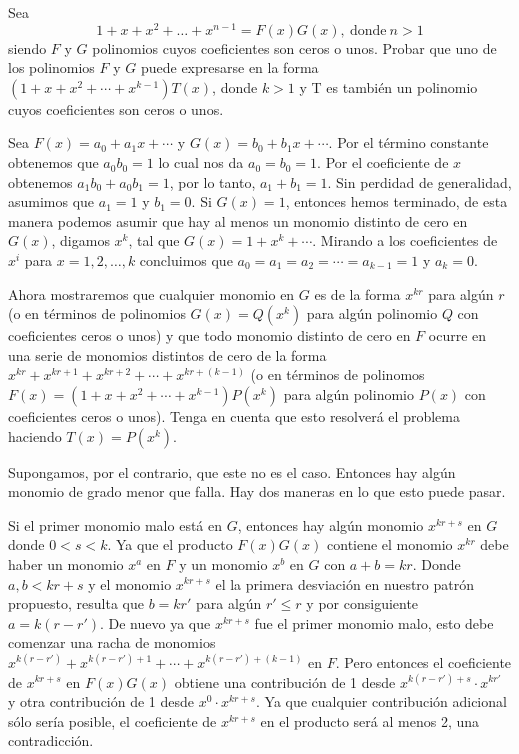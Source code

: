 \begin{example}
    Sea
    \[
        1 + x + x^2 + \ldots + x^{n - 1} = F(x) G(x),\ \text{donde}\ n > 1
    \]
    siendo $F$ y $G$ polinomios cuyos coeficientes son ceros o unos.
    Probar que uno de los polinomios $F$ y $G$ puede expresarse en la forma $(1 + x + x^2 + \cdots + x^{k - 1})T(x)$, donde $k > 1$ y T es también un polinomio cuyos coeficientes son ceros o unos.
\end{example}
\begin{solution}
    Sea $F(x) = a_0 + a_1 x + \cdots$ y $G(x) = b_0 + b_1 x + \cdots$.
    Por el término constante obtenemos que $a_0 b_0 = 1$ lo cual nos da $a_0 = b_0 = 1$.
    Por el coeficiente de $x$ obtenemos $a_1 b_0 + a_0 b_1 = 1$, por lo tanto, $a_1 + b_1 = 1$.
    Sin perdidad de generalidad, asumimos que $a_1 = 1$ y $b_1 = 0$.
    Si $G(x) = 1$, entonces hemos terminado, de esta manera podemos asumir que hay al menos un monomio distinto de cero en $G(x)$, digamos $x^k$, tal que $G(x) = 1 + x^k + \cdots$.
    Mirando a los coeficientes de $x^i$ para $x = 1, 2,\ldots, k$ concluimos que $a_0 = a_1 = a_2 = \cdots = a_{k - 1} = 1$ y $a_k = 0$.

    Ahora mostraremos que cualquier monomio en $G$ es de la forma $x^{kr}$ para algún $r$ (o en términos de polinomios $G(x) = Q(x^k)$ para algún polinomio $Q$ con coeficientes ceros o unos) y que todo monomio distinto de cero en $F$ ocurre en una serie de monomios distintos de cero de la forma $x^{kr} + x^{kr + 1} + x^{kr + 2} + \cdots + x^{kr + (k - 1)}$ (o en términos de polinomos $F(x) = (1 + x + x^2 + \cdots + x^{k - 1}) P(x^k)$ para algún polinomio $P(x)$ con coeficientes ceros o unos).
    Tenga en cuenta que esto resolverá el problema haciendo $T(x) = P(x^k)$.

    Supongamos, por el contrario, que este no es el caso.
    Entonces hay algún monomio de grado menor que falla.
    Hay dos maneras en lo que esto puede pasar.

    Si el primer monomio malo está en $G$, entonces hay algún monomio $x^{kr + s}$ en $G$ donde $0 < s < k$.
    Ya que el producto $F(x) G(x)$ contiene el monomio $x^{kr}$ debe haber un monomio $x^a$ en $F$ y un monomio $x^b$ en $G$ con $a + b = kr$.
    Donde $a,b < kr + s$ y el monomio $x^{kr + s}$ el la primera desviación en nuestro patrón propuesto, resulta que $b = k r'$ para algún $r'\leq r$ y por consiguiente $a = k(r - r')$.
    De nuevo ya que $x^{kr + s}$ fue el primer monomio malo, esto debe comenzar una racha de monomios $x^{k(r - r')} + x^{k(r - r') + 1} + \cdots + x^{k(r - r') + (k - 1)}$ en $F$.
    Pero entonces el coeficiente de $x^{kr + s}$ en $F(x) G(x)$ obtiene una contribución de 1 desde $x^{k(r - r') + s} \cdot x^{kr'}$ y otra contribución de 1 desde $x^0 \cdot x^{kr + s}$.
    Ya que cualquier contribución adicional sólo sería posible, el coeficiente de $x^{kr + s}$ en el producto será al menos 2, una contradicción.


\end{solution}
